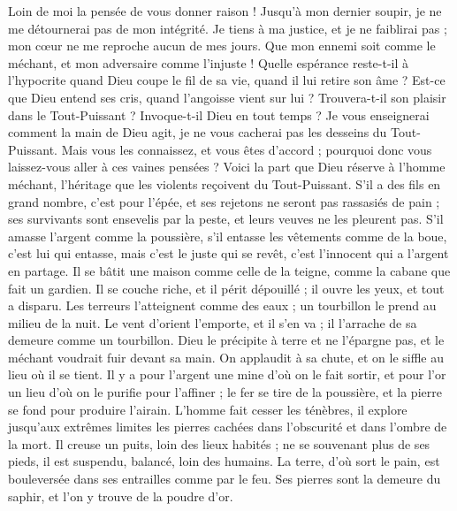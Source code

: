 \begin{multicols}{2}
Loin de moi la pensée de vous donner raison ! Jusqu'à mon dernier soupir, je ne me détournerai pas de mon intégrité.
Je tiens à ma justice, et je ne faiblirai pas ; mon cœur ne me reproche aucun de mes jours.
Que mon ennemi soit comme le méchant, et mon adversaire comme l'injuste !
Quelle espérance reste-t-il à l'hypocrite quand Dieu coupe le fil de sa vie, quand il lui retire son âme ?
Est-ce que Dieu entend ses cris, quand l'angoisse vient sur lui ?
Trouvera-t-il son plaisir dans le Tout-Puissant ? Invoque-t-il Dieu en tout temps ?
Je vous enseignerai comment la main de Dieu agit, je ne vous cacherai pas les desseins du Tout-Puissant.
Mais vous les connaissez, et vous êtes d'accord ; pourquoi donc vous laissez-vous aller à ces vaines pensées ?
Voici la part que Dieu réserve à l'homme méchant, l'héritage que les violents reçoivent du Tout-Puissant.
S'il a des fils en grand nombre, c'est pour l'épée, et ses rejetons ne seront pas rassasiés de pain ;
ses survivants sont ensevelis par la peste, et leurs veuves ne les pleurent pas.
S'il amasse l'argent comme la poussière, s'il entasse les vêtements comme de la boue,
c'est lui qui entasse, mais c'est le juste qui se revêt, c'est l'innocent qui a l'argent en partage.
Il se bâtit une maison comme celle de la teigne, comme la cabane que fait un gardien.
Il se couche riche, et il périt dépouillé ; il ouvre les yeux, et tout a disparu.
Les terreurs l'atteignent comme des eaux ; un tourbillon le prend au milieu de la nuit.
Le vent d'orient l'emporte, et il s'en va ; il l'arrache de sa demeure comme un tourbillon.
Dieu le précipite à terre et ne l'épargne pas, et le méchant voudrait fuir devant sa main.
On applaudit à sa chute, et on le siffle au lieu où il se tient.
\VerseOne{}Il y a pour l'argent une mine d'où on le fait sortir, et pour l'or un lieu d'où on le purifie pour l'affiner ;
le fer se tire de la poussière, et la pierre se fond pour produire l'airain.
L'homme fait cesser les ténèbres, il explore jusqu'aux extrêmes limites les pierres cachées dans l'obscurité et dans l'ombre de la mort.
Il creuse un puits, loin des lieux habités ; ne se souvenant plus de ses pieds, il est suspendu, balancé, loin des humains.
La terre, d'où sort le pain, est bouleversée dans ses entrailles comme par le feu.
Ses pierres sont la demeure du saphir, et l'on y trouve de la poudre d'or.

\end{multicols}
